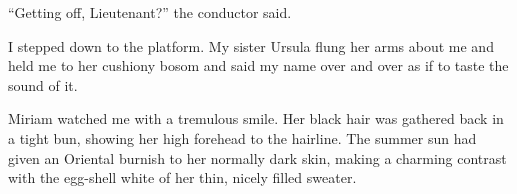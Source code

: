 \documentclass{novel}
\begin{document}
\begin{toc}[0.5]{0em}
{\centering{}\par}
\null





















\end{toc}
\clearpage

\mainmatter
\cleartorecto
\thispagestyle{empty}


\begin{ChapterStart}
\vspace{3\nbs}
\end{ChapterStart}

“Getting off, Lieutenant?” the conductor said.

I stepped down to the platform. My sister Ursula flung her arms about me and held me to her cushiony bosom and said my name over and over as if to taste the sound of it.

Miriam watched me with a tremulous smile. Her black hair was gathered back in a tight bun, showing her high forehead to the hairline. The summer sun had given an Oriental burnish to her normally dark skin, making a charming contrast with the egg-shell white of her thin, nicely filled sweater.
\end{document}
